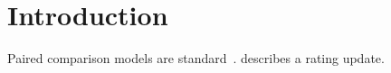 \documentclass{article}
\begin{document}
\section{Introduction}
Paired comparison models are standard~\parencite{Bradley1952}.
\textcite{Elo1978} describes a rating update.

\printbibliography
\end{document}
